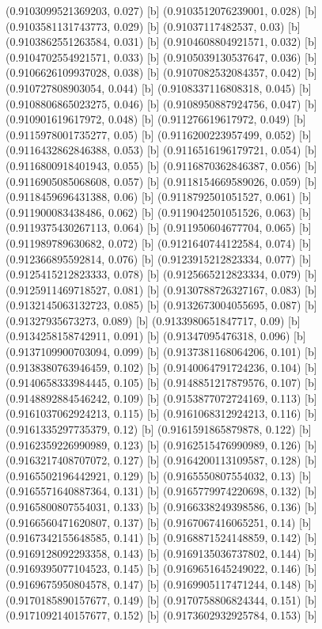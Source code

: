 {{{(0.9103099521369203, 0.027) [b] 
(0.9103512076239001, 0.028) [b] 
(0.9103581131743773, 0.029) [b] 
(0.91037117482537, 0.03) [b] 
(0.9103862551263584, 0.031) [b] 
(0.9104608804921571, 0.032) [b] 
(0.9104702554921571, 0.033) [b] 
(0.9105039130537647, 0.036) [b] 
(0.9106626109937028, 0.038) [b] 
(0.9107082532084357, 0.042) [b] 
(0.910727808903054, 0.044) [b] 
(0.9108337116808318, 0.045) [b] 
(0.9108806865023275, 0.046) [b] 
(0.9108950887924756, 0.047) [b] 
(0.910901619617972, 0.048) [b] 
(0.911276619617972, 0.049) [b] 
(0.9115978001735277, 0.05) [b] 
(0.9116200223957499, 0.052) [b] 
(0.9116432862846388, 0.053) [b] 
(0.9116516196179721, 0.054) [b] 
(0.9116800918401943, 0.055) [b] 
(0.9116870362846387, 0.056) [b] 
(0.9116905085068608, 0.057) [b] 
(0.9118154669589026, 0.059) [b] 
(0.9118459696431388, 0.06) [b] 
(0.9118792501051527, 0.061) [b] 
(0.911900083438486, 0.062) [b] 
(0.9119042501051526, 0.063) [b] 
(0.9119375430267113, 0.064) [b] 
(0.911950604677704, 0.065) [b] 
(0.911989789630682, 0.072) [b] 
(0.9121640744122584, 0.074) [b] 
(0.912366895592814, 0.076) [b] 
(0.9123915212823334, 0.077) [b] 
(0.9125415212823333, 0.078) [b] 
(0.9125665212823334, 0.079) [b] 
(0.9125911469718527, 0.081) [b] 
(0.9130788726327167, 0.083) [b] 
(0.9132145063132723, 0.085) [b] 
(0.9132673004055695, 0.087) [b] 
(0.91327935673273, 0.089) [b] 
(0.9133980651847717, 0.09) [b] 
(0.9134258158742911, 0.091) [b] 
(0.91347095476318, 0.096) [b] 
(0.9137109900703094, 0.099) [b] 
(0.9137381168064206, 0.101) [b] 
(0.9138380763946459, 0.102) [b] 
(0.9140064791724236, 0.104) [b] 
(0.9140658333984445, 0.105) [b] 
(0.9148851217879576, 0.107) [b] 
(0.9148892884546242, 0.109) [b] 
(0.9153877072724169, 0.113) [b] 
(0.9161037062924213, 0.115) [b] 
(0.9161068312924213, 0.116) [b] 
(0.9161335297735379, 0.12) [b] 
(0.9161591865879878, 0.122) [b] 
(0.9162359226990989, 0.123) [b] 
(0.9162515476990989, 0.126) [b] 
(0.9163217408707072, 0.127) [b] 
(0.9164200113109587, 0.128) [b] 
(0.9165502196442921, 0.129) [b] 
(0.9165550807554032, 0.13) [b] 
(0.9165571640887364, 0.131) [b] 
(0.9165779974220698, 0.132) [b] 
(0.9165800807554031, 0.133) [b] 
(0.9166338249398586, 0.136) [b] 
(0.9166560471620807, 0.137) [b] 
(0.9167067416065251, 0.14) [b] 
(0.9167342155648585, 0.141) [b] 
(0.9168871524148859, 0.142) [b] 
(0.9169128092293358, 0.143) [b] 
(0.9169135036737802, 0.144) [b] 
(0.9169395077104523, 0.145) [b] 
(0.9169651645249022, 0.146) [b] 
(0.9169675950804578, 0.147) [b] 
(0.9169905117471244, 0.148) [b] 
(0.9170185890157677, 0.149) [b] 
(0.9170758806824344, 0.151) [b] 
(0.9171092140157677, 0.152) [b] 
(0.9173602932925784, 0.153) [b] 
}}}
